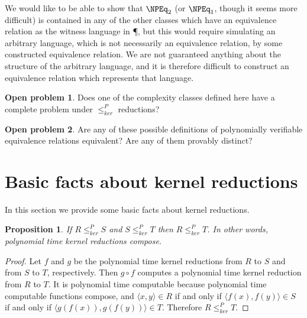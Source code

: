 \documentclass[draft]{article}
\newtheorem{proposition}[proposition]{Proposition}
\theoremstyle{definition} \newtheorem{openproblem}[openproblem]{Open problem}
\theoremstyle{definition} \newtheorem{definition}[definition]{Definition}
\theoremstyle{remark} \newtheorem{remark}{Remark}
\newcommand{\sigmastar}{\{0, 1\}^{*}} %
\newcommand{\kr}{\leq^{P}_{ker}} %
\newcommand{\krnt}{\leq_{ker}} %
\newcommand{\pair}[2]{\langle#1,#2\rangle} %
\begin{document}
We would like to be able to show that $\NPEq_2$ (or $\NPEq_1$, though it seems more difficult) is contained in any of the other classes which have an equivalence relation as the witness language in \P, but this would require simulating an arbitrary language, which is not necessarily an equivalence relation, by some constructed equivalence relation.
We are not guaranteed anything about the structure of the arbitrary language, and it is therefore difficult to construct an equivalence relation which represents that language.

\begin{openproblem}
  Does one of the complexity classes defined here have a complete problem under $\kr$ reductions?
\end{openproblem}
\begin{openproblem}
  Are any of these possible definitions of polynomially verifiable equivalence relations equivalent? Are any of them provably distinct?
\end{openproblem}

\section{Basic facts about kernel reductions}

In this section we provide some basic facts about kernel reductions.

\begin{proposition}\label{prop:compose}
  If $R\kr S$ and $S\kr T$ then $R\kr T$. In other words, polynomial time kernel reductions compose.
\end{proposition}
\begin{proof}
  Let $f$ and $g$ be the polynomial time kernel reductions from $R$ to $S$ and from $S$ to $T$, respectively.
  Then $g\circ f$ computes a polynomial time kernel reduction from $R$ to $T$.
  It is polynomial time computable because polynomial time computable functions compose, and $\pair{x}{y}\in R$ if and only if $\pair{f(x)}{f(y)}\in S$ if and only if $\pair{g(f(x))}{g(f(y))}\in T$.
  Therefore $R\kr T$.
\end{proof}

\end{document}
